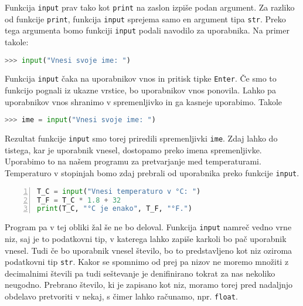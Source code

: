 Funkcija \texttt{input} prav tako kot \texttt{print} na zaslon izpiše podan argument. Za razliko od funkcije \texttt{print}, funkcija \texttt{input} sprejema samo en argument tipa \texttt{str}. Preko tega argumenta bomo funkciji \texttt{input} podali navodilo za uporabnika. Na primer takole:
\begin{lstlisting}[language=Python]
>>> input("Vnesi svoje ime: ")
\end{lstlisting}
Funkcija \texttt{input} čaka na uporabnikov vnos in pritisk tipke \texttt{Enter}. Če smo to funkcijo pognali iz ukazne vrstice, bo uporabnikov vnos ponovila. Lahko pa uporabnikov vnos shranimo v spremenljivko in ga kasneje uporabimo. Takole
\begin{lstlisting}[language=Python]
>>> ime = input("Vnesi svoje ime: ")
\end{lstlisting}
Rezultat funkcije \texttt{input} smo torej priredili spremenljivki \texttt{ime}. Zdaj lahko do tistega, kar je uporabnik vnesel, dostopamo preko imena spremenljivke. Uporabimo to na našem programu za pretvarjanje med temperaturami. Temperaturo v stopinjah bomo zdaj prebrali od uporabnika preko funkcije \texttt{input}.
\begin{lstlisting}[language=Python,numbers=left]
T_C = input("Vnesi temperaturo v °C: ")
T_F = T_C * 1.8 + 32
print(T_C, "°C je enako", T_F, "°F.")
\end{lstlisting}
Program pa v tej obliki žal še ne bo deloval. Funkcija \texttt{input} namreč vedno vrne niz, saj je to podatkovni tip, v katerega lahko zapiše karkoli bo pač uporabnik vnesel. Tudi če bo uporabnik vnesel število, bo to predstavljeno kot niz oziroma podatkovni tip \texttt{str}. Kakor se spomnimo od prej pa nizov ne moremo množiti z decimalnimi števili pa tudi seštevanje je denifinirano tokrat za nas nekoliko neugodno. Prebrano število, ki je zapisano kot niz, moramo torej pred nadaljnjo obdelavo pretvoriti v nekaj, s čimer lahko računamo, npr. \texttt{float}. 

